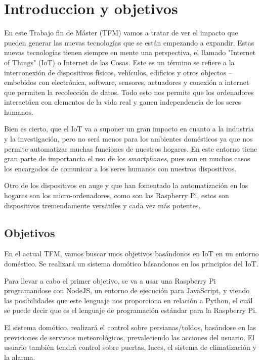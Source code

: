 \documentclass[10pt,journal,compsoc]{IEEEtran}
\begin{document}
\section{Introduccion y objetivos}
\label{sec:introduction}
\fi

\IEEEPARstart En este Trabajo fin de Máster (TFM) vamos a tratar de ver el impacto que pueden generar las nuevas tecnologías que se están empezando a expandir.
Estas nuevas tecnologías tienen siempre en mente una perspectiva, el llamado "Internet of Things" (IoT) o Internet de las Cosas. 
Este es un término se refiere a la interconexión de dispositivos físicos, vehículos, edificios y otros objectos --embebidos con electrónica, software, sensores, actuadores y conexión a internet que permiten la recolección de datos.
Todo esto nos permite que los ordenadores interactúen con elementos de la vida real y ganen independencia de los seres humanos.

Bien es cierto, que el IoT va a suponer un gran impacto en cuanto a la industria y la investigación, pero no será menos para los ambientes domésticos ya que nos permite automatizar muchas funciones de nuestros hogares.
En este entorno tiene gran parte de importancia el uso de los \textit{smartphones}, pues son en muchos casos los encargados de comunicar a los seres humanos con nuestros dispositivos.

Otro de los dispositivos en auge y que han fomentado la automatización en los hogares son los micro-ordenadores, como son las Raspberry Pi, estos son dispositivos tremendamente versátiles y cada vez más potentes.


\subsection{Objetivos}
En el actual TFM, vamos buscar unos objetivos basándonos en IoT en un entorno doméstico.
Se realizará un sistema domótico básandonos en los principios del IoT.

Para llevar a cabo el primer objetivo, se va a usar una Raspberry Pi programandose con NodeJS, un entorno de ejecución para JavaScript, y viendo las posibilidades que este lenguaje nos proporciona en relación a Python, el cuál se puede decir que es el lenguaje de programación estándar para la Raspberry Pi.

El sistema domótico, realizará el control sobre persianas/toldos, basándose en las previsiones de servicios meteorológicos, prevaleciendo las acciones del usuario. El usuario también tendrá control sobre puertas, luces, el sistema de climatización y la alarma.
\end{document}
